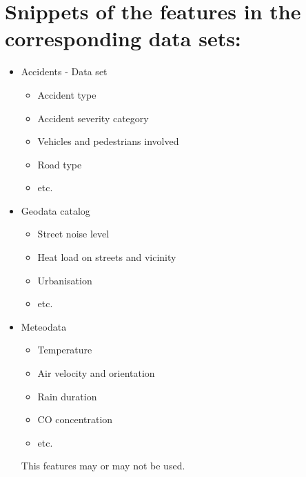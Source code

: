 \documentclass{article}
\begin{document}
\section*{Snippets of the features in the corresponding data sets:}
\begin{itemize}
    \item Accidents - Data set\vspace{0.2cm}
    \begin{itemize}
        \item Accident type
        \item Accident severity category
        \item Vehicles and pedestrians involved
        \item Road type
        \item etc.
    \end{itemize}
    \item Geodata catalog\vspace{0.2cm}    \begin{itemize}
        \item Street noise level
        \item Heat load on streets and vicinity
        \item Urbanisation
        \item etc.
    \end{itemize}
    \item Meteodata\vspace{0.2cm}
    \begin{itemize}
        \item Temperature
        \item Air velocity and orientation
        \item Rain duration
        \item CO concentration
        \item etc.
    \end{itemize}
This features may or may not be used.
\end{itemize}
\end{document}
